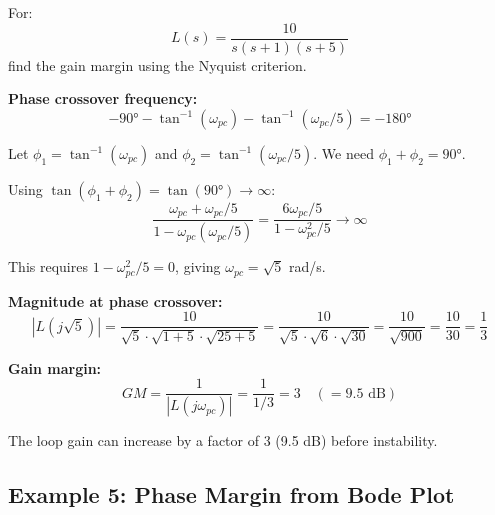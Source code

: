 \begin{example}
\label{ex:gm_nyquist}
For:
\begin{equation}
L(s) = \frac{10}{s(s+1)(s+5)}
\end{equation}
find the gain margin using the Nyquist criterion.

\textbf{Phase crossover frequency:}
\begin{equation}
-90° - \tan^{-1}(\omega_{pc}) - \tan^{-1}(\omega_{pc}/5) = -180°
\end{equation}

Let $\phi_1 = \tan^{-1}(\omega_{pc})$ and $\phi_2 = \tan^{-1}(\omega_{pc}/5)$. We need $\phi_1 + \phi_2 = 90°$.

Using $\tan(\phi_1 + \phi_2) = \tan(90°) \to \infty$:
\begin{equation}
\frac{\omega_{pc} + \omega_{pc}/5}{1 - \omega_{pc}(\omega_{pc}/5)} = \frac{6\omega_{pc}/5}{1 - \omega_{pc}^2/5} \to \infty
\end{equation}

This requires $1 - \omega_{pc}^2/5 = 0$, giving $\omega_{pc} = \sqrt{5}$ rad/s.

\textbf{Magnitude at phase crossover:}
\begin{equation}
|L(j\sqrt{5})| = \frac{10}{\sqrt{5} \cdot \sqrt{1+5} \cdot \sqrt{25+5}} = \frac{10}{\sqrt{5} \cdot \sqrt{6} \cdot \sqrt{30}} = \frac{10}{\sqrt{900}} = \frac{10}{30} = \frac{1}{3}
\end{equation}

\textbf{Gain margin:}
\begin{equation}
GM = \frac{1}{|L(j\omega_{pc})|} = \frac{1}{1/3} = 3 \quad (= 9.5 \text{ dB})
\end{equation}

The loop gain can increase by a factor of 3 (9.5 dB) before instability.
\end{example}

\subsection{Example 5: Phase Margin from Bode Plot}

